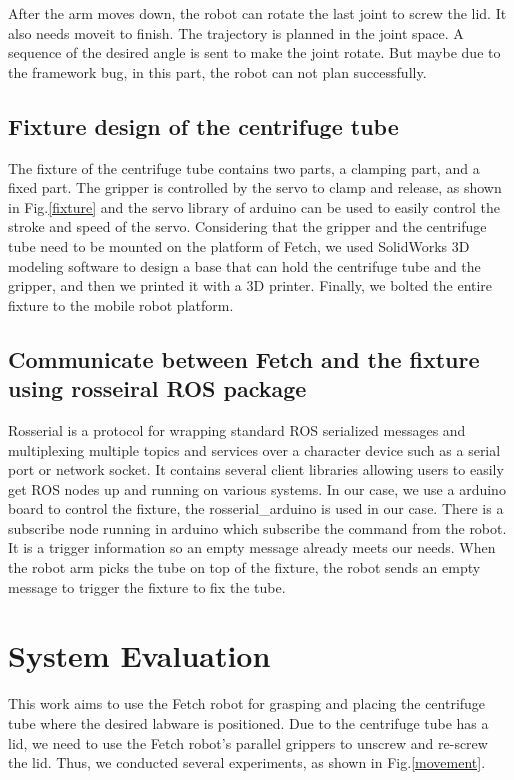 \documentclass[12pt,draftclsnofoot,onecolumn]{IEEEtran}
\begin{document}
	After the arm moves down, the robot can rotate the last joint to screw the lid. It also needs moveit to finish. The trajectory is planned in the joint space. A sequence of the desired angle is sent to make the joint rotate. But maybe due to the framework bug, in this part, the robot can not plan successfully.
	
	\subsection{Fixture design of the centrifuge tube}
    The fixture of the centrifuge tube contains two parts, a clamping part, and a fixed part. The gripper is controlled by the servo to clamp and release, as shown in Fig.\ref{fixture} and the servo library of arduino can be used to easily control the stroke and speed of the servo. Considering that the gripper and the centrifuge tube need to be mounted on the platform of Fetch, we used SolidWorks 3D modeling software to design a base that can hold the centrifuge tube and the gripper, and then we printed it with a 3D printer. Finally, we bolted the entire fixture to the mobile robot platform.
	
	\subsection{Communicate between Fetch and the fixture using rosseiral ROS package}
	Rosserial is a protocol for wrapping standard ROS serialized messages and multiplexing multiple topics and services over a character device such as a serial port or network socket. It contains several client libraries allowing users to easily get ROS nodes up and running on various systems. In our case, we use a arduino board to control the fixture, the rosserial\_arduino is used in our case. There is a subscribe node running in arduino which subscribe the command from the robot. It is a trigger information so an empty message already meets our needs. When the robot arm picks the tube on top of the fixture, the robot sends an empty message to trigger the fixture to fix the tube.
	
    
	
	\section{System Evaluation}
	This work aims to use the Fetch robot for grasping and placing the centrifuge tube where the desired labware is positioned. Due to the centrifuge tube has a lid, we need to use the Fetch robot's parallel grippers to unscrew and re-screw the lid. Thus, we conducted several experiments, as shown in Fig.\ref{movement}.
	
\end{document}
